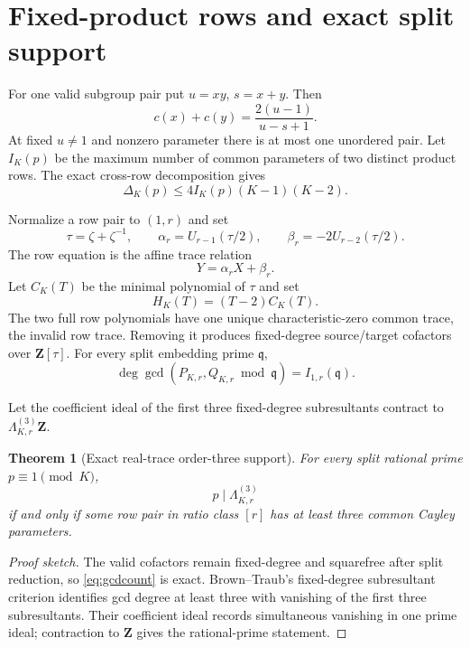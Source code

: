 \documentclass[11pt]{article}
\newtheorem{theorem}{Theorem}[section]
\newcommand{\Z}{\mathbf Z}
\begin{document}
\section{Fixed-product rows and exact split support}

For one valid subgroup pair put $u=xy$, $s=x+y$.  Then
\begin{equation}\label{eq:rowparam}
c(x)+c(y)=\frac{2(u-1)}{u-s+1}.
\end{equation}
At fixed $u\ne1$ and nonzero parameter there is at most one unordered pair.
Let $I_K(p)$ be the maximum number of common parameters of two distinct product
rows.  The exact cross-row decomposition gives
\begin{equation}\label{eq:rowenergy}
\Delta_K(p)\le4I_K(p)(K-1)(K-2).
\end{equation}

Normalize a row pair to $(1,r)$ and set
\[
\tau=\zeta+\zeta^{-1},\qquad
\alpha_r=U_{r-1}(\tau/2),\qquad
\beta_r=-2U_{r-2}(\tau/2).
\]
The row equation is the affine trace relation
\begin{equation}\label{eq:affinetrace}
Y=\alpha_rX+\beta_r.
\end{equation}
Let $C_K(T)$ be the minimal polynomial of $\tau$ and set
\[
H_K(T)=(T-2)C_K(T).
\]
The two full row polynomials have one unique characteristic-zero common trace,
the invalid row trace.  Removing it produces fixed-degree source/target
cofactors over $\Z[\tau]$.  For every split embedding prime $\mathfrak q$,
\begin{equation}\label{eq:gcdcount}
\deg\gcd(P_{K,r},Q_{K,r}\bmod\mathfrak q)
 =I_{1,r}(\mathfrak q).
\end{equation}

Let the coefficient ideal of the first three fixed-degree subresultants
contract to $\Lambda_{K,r}^{(3)}\Z$.

\begin{theorem}[Exact real-trace order-three support]\label{thm:lambda}
For every split rational prime $p\equiv1\pmod K$,
\[
p\mid\Lambda_{K,r}^{(3)}
\]
if and only if some row pair in ratio class $[r]$ has at least three common
Cayley parameters.
\end{theorem}

\begin{proof}[Proof sketch]
The valid cofactors remain fixed-degree and squarefree after split reduction,
so \eqref{eq:gcdcount} is exact.  Brown--Traub's fixed-degree subresultant
criterion \cite{BT1971} identifies gcd degree at least three with vanishing of
the first three subresultants.  Their coefficient ideal records simultaneous
vanishing in one prime ideal; contraction to $\Z$ gives the rational-prime
statement.
\end{proof}
\end{document}
